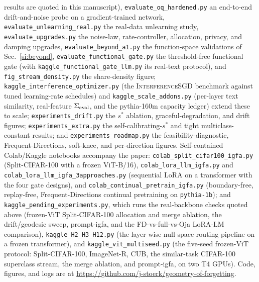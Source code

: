 \documentclass[10pt,a4paper]{article}
\theoremstyle{plain}
\theoremstyle{definition}
\newcommand{\Sig}{\Sigma}
\newcommand{\sstar}{s^{\ast}}
\newcommand{\IGFA}{igfa}
\begin{document}
results are quoted in this manuscript), \texttt{evaluate\_oq\_hardened.py} an
end-to-end drift-and-noise probe on a gradient-trained network,
\texttt{evaluate\_unlearning\_real.py} the real-data unlearning study,
\texttt{evaluate\_upgrades.py} the noise-law, rate-controller, allocation, privacy, and
damping upgrades, \texttt{evaluate\_beyond\_a1.py} the function-space validations of
Sec.~\ref{si:beyond}, \texttt{evaluate\_functional\_gate.py} the threshold-free
functional gate (with \texttt{kaggle\_functional\_gate\_llm.py} its real-text protocol),
and \texttt{fig\_stream\_density.py} the share-density figure;
\texttt{kaggle\_interference\_optimizer.py} (the \textsc{InterferenceSGD} benchmark against
tuned learning-rate schedules) and \texttt{kaggle\_scale\_addons.py} (per-layer text
similarity, real-feature $\Sig_{\rm eval}$, and the pythia-160m capacity ledger) extend
these to scale;
\texttt{experiments\_drift.py} the $\sstar$ ablation, graceful-degradation, and drift figures;
\texttt{experiments\_extra.py} the self-calibrating-$\sstar$ and tight multiclass-constant
results; and \texttt{experiments\_roadmap.py} the feasibility-diagnostic, Frequent-Directions,
soft-knee, and per-direction figures. Self-contained Colab/Kaggle notebooks accompany the paper:
\texttt{colab\_split\_cifar100\_igfa.py} (Split-CIFAR-100 with a frozen ViT-B/16),
\texttt{colab\_lora\_llm\_igfa.py} and \texttt{colab\_lora\_llm\_igfa\_3approaches.py}
(sequential LoRA on a transformer with the four gate designs), and
\texttt{colab\_continual\_pretrain\_igfa.py} (boundary-free, replay-free,
Frequent-Directions continual pretraining on \texttt{pythia-1b}); and
\texttt{kaggle\_pending\_experiments.py}, which runs the real-backbone checks quoted above
(frozen-ViT Split-CIFAR-100 allocation and merge ablation, the drift/geodesic sweep,
prompt-\IGFA, and the FD-vs-full-vs-Oja LoRA-LM comparison), \texttt{kaggle\_H2\_H3\_H12.py}
(the layer-wise null-space-routing pipeline on a frozen transformer), and
\texttt{kaggle\_vit\_multiseed.py} (the five-seed frozen-ViT protocol: Split-CIFAR-100,
ImageNet-R, CUB, the similar-task CIFAR-100 superclass stream, the merge ablation, and
prompt-\IGFA, on two T4 GPUs). Code, figures, and logs are at
\url{https://github.com/j-stoerk/geometry-of-forgetting}.

\clearpage
\appendix
\renewcommand{\thesection}{S\arabic{section}}
\setcounter{section}{0}
\setcounter{figure}{0}
\setcounter{table}{0}
\end{document}
